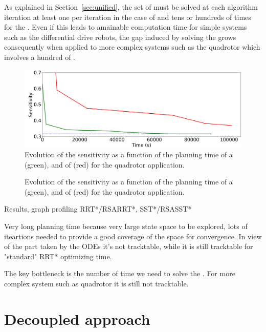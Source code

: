 As explained in Section~\ref{sec:unified}, the set of  must be solved at each algorithm iteration at least one per iteration in the case of  and tens or hundreds of times for the .
Even if this leads to amainable computation time for simple systems such as the differential drive robots, the gap induced by solving the  grows consequently when applied to more complex systems such as the quadrotor which involves a hundred of . 

\begin{figure} [t]
    \centering
    \includegraphics[width=0.7\linewidth]{figures/samp/SSTstar_Sensi.png} 
    \caption{Evolution of the sensitivity as a function of the planning time of a  (green), and of  (red) for the quadrotor application.}%
    \label{fig:samp_quad_time}%
\end{figure}

\begin{figure} [h]
    \centering
     
    \caption{Evolution of the sensitivity as a function of the planning time of a  (green), and of  (red) for the quadrotor application.}%
    \label{fig:profiling_quad}%
\end{figure}

Results, graph profiling RRT*/RSARRT*, SST*/RSASST*

Very long planning time because very large state space to be explored, lots of iteartions needed to provide a good coverage of the space for convergence.
In view of the part taken by the ODEs it's not tracktable, while it is still tracktable for "standard" RRT* optimizing time.

The key bottleneck is the number of time we need to solve the . 
For more complex system such as quadrotor it is still not tracktable.

\section{Decoupled approach}\label{sec:decoupled}

